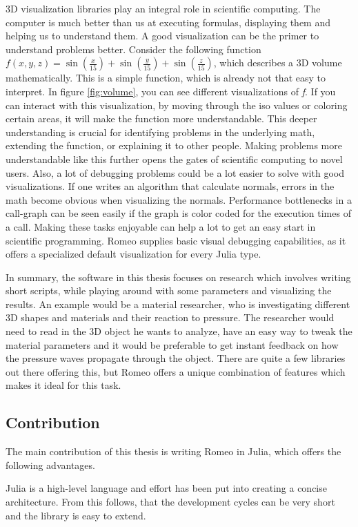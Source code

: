 3D visualization libraries play an integral role in scientific computing.
The computer is much better than us at executing formulas, displaying them and helping us to understand them.
A good visualization can be the primer to understand problems better.
Consider the following function $f(x,y,z)=\sin(\frac{x}{15})+\sin(\frac{y}{15})+\sin(\frac{z}{15})$, which describes a 3D volume mathematically. 
This is a simple function, which is already not that easy to interpret. In figure \ref{fig:volume}, you can see different visualizations of \textit{f}.
If you can interact with this visualization, by moving through the iso values or coloring certain areas, it will make the function more understandable.
This deeper understanding is crucial for identifying problems in the underlying math, extending the function, or explaining it to other people. Making problems more understandable like this further opens the gates of scientific computing to novel users.
Also, a lot of debugging problems could be a lot easier to solve with good visualizations. If one writes an algorithm that calculate normals, errors in the math become obvious when visualizing the normals.
Performance bottlenecks in a call-graph can be seen easily if the graph is color coded for the execution times of a call. Making these tasks enjoyable can help a lot to get an easy start in scientific programming.
Romeo supplies basic visual debugging capabilities, as it offers a specialized default visualization for every Julia type.

In summary, the software in this thesis focuses on research which involves writing short scripts, while playing around with some parameters and visualizing the results.
An example would be a material researcher, who is investigating different 3D shapes and materials and their reaction to pressure.
The researcher would need to read in the 3D object he wants to analyze, have an easy way to tweak the material parameters and it would be preferable to get instant feedback on how the pressure waves propagate through the object.
There are quite a few libraries out there offering this, but Romeo offers a unique combination of features which makes it ideal for this task.

\subsection{Contribution}
The main contribution of this thesis is writing Romeo in Julia, which offers the following advantages.

Julia is a high-level language and effort has been put into creating a concise architecture. From this follows, that the development cycles can be very short and the library is easy to extend.

